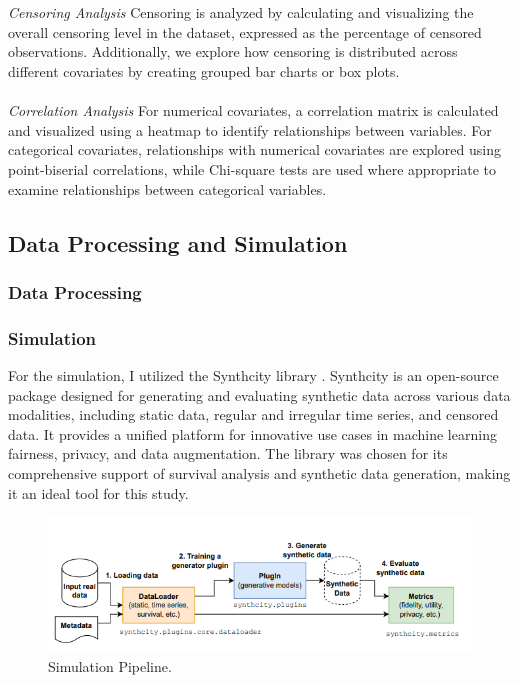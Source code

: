 \\\\
\noindent \textit{Censoring Analysis} Censoring is analyzed by calculating and visualizing the overall censoring level in the dataset, expressed as the percentage of censored observations. Additionally, we explore how censoring is distributed across different covariates by creating grouped bar charts or box plots.
\\\\
\noindent \textit{Correlation Analysis} For numerical covariates, a correlation matrix is calculated and visualized using a heatmap to identify relationships between variables. For categorical covariates, relationships with numerical covariates are explored using point-biserial correlations, while Chi-square tests are used where appropriate to examine relationships between categorical variables.

\subsection{Data Processing and Simulation}

\subsubsection*{Data Processing}
\subsubsection*{Simulation}
For the simulation, I utilized the Synthcity library \parencite{qian_synthcity_2023}. Synthcity is an open-source package designed for generating and evaluating synthetic data across various data modalities, including static data, regular and irregular time series, and censored data. It provides a unified platform for innovative use cases in machine learning fairness, privacy, and data augmentation. The library was chosen for its comprehensive support of survival analysis and synthetic data generation, making it an ideal tool for this study.
\begin{figure}[h]
    \centering
    \includegraphics[scale=0.68]{Figures/SynthCity.png}
    \caption{\parencite{qian_synthcity_2023} Simulation Pipeline.}
\end{figure}

